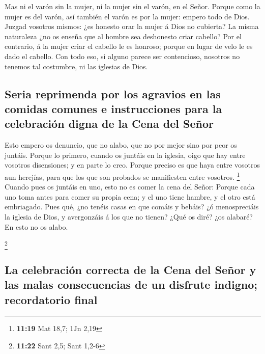  Mas ni el varón sin la mujer, ni la mujer sin el varón, en
el Señor.  Porque como la mujer es del varón, así también
el varón es por la mujer: empero todo de Dios.  Juzgad
vosotros mismos: ¿es honesto orar la mujer á Dios no cubierta?
 La misma naturaleza ¿no os enseña que al hombre sea
deshonesto criar cabello?  Por el contrario, á la mujer
criar el cabello le es honroso; porque en lugar de velo le es dado el
cabello.  Con todo eso, si alguno parece ser contencioso,
nosotros no tenemos tal costumbre, ni las iglesias de Dios.

\hypertarget{seria-reprimenda-por-los-agravios-en-las-comidas-comunes-e-instrucciones-para-la-celebraciuxf3n-digna-de-la-cena-del-seuxf1or}{%
\subsection{Seria reprimenda por los agravios en las comidas comunes e
instrucciones para la celebración digna de la Cena del
Señor}\label{seria-reprimenda-por-los-agravios-en-las-comidas-comunes-e-instrucciones-para-la-celebraciuxf3n-digna-de-la-cena-del-seuxf1or}}

 Esto empero os denuncio, que no alabo, que no por mejor
sino por peor os juntáis.  Porque lo primero, cuando os
juntáis en la iglesia, oigo que hay entre vosotros disensiones; y en
parte lo creo.  Porque preciso es que haya entre vosotros
aun herejías, para que los que son probados se manifiesten entre
vosotros. \footnote{\textbf{11:19} Mat 18,7; 1Jn 2,19} 
Cuando pues os juntáis en uno, esto no es comer la cena del Señor:
 Porque cada uno toma antes para comer su propia cena; y el
uno tiene hambre, y el otro está embriagado.  Pues qué, ¿no
tenéis casas en que comáis y bebáis? ¿ó menospreciáis la iglesia de
Dios, y avergonzáis á los que no tienen? ¿Qué os diré? ¿os alabaré? En
esto no os alabo.

\footnote{\textbf{11:22} Sant 2,5; Sant 1,2-6}

\hypertarget{la-celebraciuxf3n-correcta-de-la-cena-del-seuxf1or-y-las-malas-consecuencias-de-un-disfrute-indigno-recordatorio-final}{%
\subsection{La celebración correcta de la Cena del Señor y las malas
consecuencias de un disfrute indigno; recordatorio
final}\label{la-celebraciuxf3n-correcta-de-la-cena-del-seuxf1or-y-las-malas-consecuencias-de-un-disfrute-indigno-recordatorio-final}}

